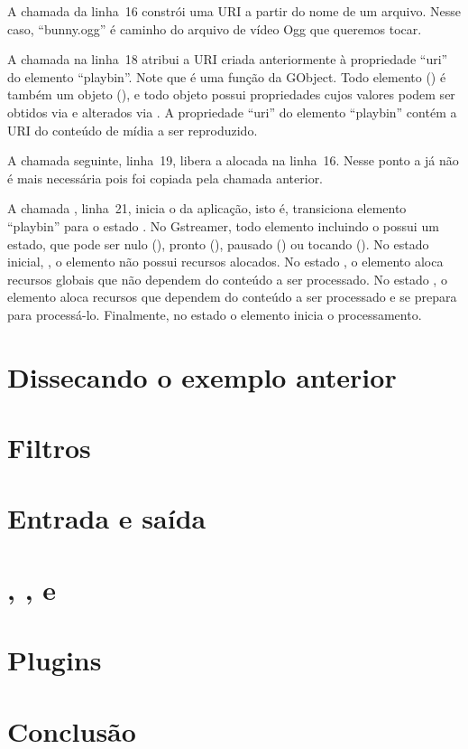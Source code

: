 \documentclass{SBCbookchapter}
\begin{document}
A chamada da linha~16 constrói uma URI a partir do nome de um arquivo.
Nesse caso, ``bunny.ogg'' é caminho do arquivo de vídeo Ogg que queremos
tocar.

A chamada  na linha~18 atribui a URI criada anteriormente à
propriedade ``uri'' do elemento ``playbin''.  Note que  é
uma função da GObject.  Todo elemento () é também um objeto
(), e todo objeto possui propriedades cujos valores podem ser
obtidos via  e alterados via .
A propriedade ``uri'' do elemento ``playbin'' contém a URI do conteúdo de
mídia a ser reproduzido.

A chamada seguinte, linha~19, libera a  alocada na linha~16.
Nesse ponto a  já não é mais necessária pois foi copiada pela
chamada  anterior.

A chamada , linha~21, inicia o  da
aplicação, isto é, transiciona elemento ``playbin'' para o estado
.  No Gstreamer, todo elemento incluindo o
 possui um estado, que pode ser nulo (), pronto
(), pausado () ou tocando ().  No estado
inicial, , o elemento não possui recursos alocados.  No estado
, o elemento aloca recursos globais que não dependem do conteúdo a
ser processado.  No estado , o elemento aloca recursos que
dependem do conteúdo a ser processado e se prepara para processá-lo.
Finalmente, no estado  o elemento inicia o processamento.



\section{Dissecando o exemplo anterior}
\label{sec:dissec}


\section{Filtros}
\label{sec:filtros}


\section{Entrada e saída}
\label{sec:e/s}


\section{, , 
  e~}
\label{sec:ops}


\section{Plugins}
\label{sec:plugins}


\section{Conclusão}
\label{sec:conclusao}




\end{document}
